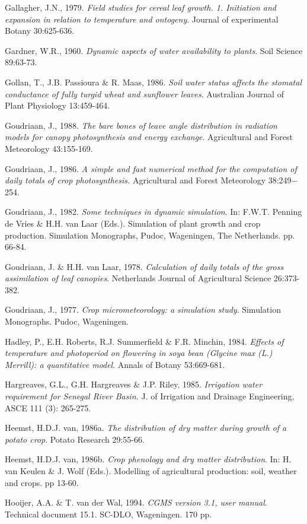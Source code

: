 Gallagher, J.N., 1979. {\it Field studies for cereal leaf growth. 1. Initiation and expansion in
relation to temperature and ontogeny\/}. Journal of experimental Botany 30:625-636.

Gardner, W.R., 1960. {\it Dynamic aspects of water availability to plants\/}. Soil Science 89:63-73.

Gollan, T., J.B. Passioura \& R. Maas, 1986. {\it Soil water status affects the stomatal
conductance of fully turgid wheat and sunflower leaves\/}. Australian Journal of Plant
Physiology 13:459-464.

Goudriaan, J., 1988. {\it The bare bones of leave angle distribution in radiation models for
canopy photosynthesis and energy exchange\/}. Agricultural and Forest Meteorology 43:155-169.

Goudriaan, J., 1986. {\it A simple and fast numerical method for the computation of daily totals
of crop photosynthesis.\/} Agricultural and Forest Meteorology 38:249$-$254. 

Goudriaan, J., 1982. {\it Some techniques in dynamic simulation\/}. In:  F.W.T. Penning de Vries
\& H.H. van Laar (Eds.). Simulation of plant growth and crop production. Simulation
Monographs, Pudoc, Wageningen, The Netherlands. pp. 66-84.

Goudriaan, J. \& H.H. van Laar, 1978. {\it Calculation of daily totals of the gross assimilation
of leaf canopies\/}. Netherlands Journal of Agricultural Science 26:373-382.

Goudriaan, J., 1977. {\it Crop micrometeorology: a simulation study\/}. Simulation Monographs.
Pudoc, Wageningen.

Hadley, P., E.H. Roberts, R.J. Summerfield \& F.R. Minchin, 1984. {\it Effects of temperature
and photoperiod on flowering in soya bean (Glycine max (L.) Merrill): a quantitative model\/}.
Annals of Botany 53:669-681.

Hargreaves, G.L., G.H. Hargreaves \& J.P. Riley, 1985. {\it Irrigation water requirement for
Senegal River Basin.\/} J. of Irrigation and Drainage Engineer\-ing, ASCE 111 (3): 265-275.

Heemst, H.D.J. van, 1986a. {\it The distribution of dry matter during growth of a potato crop\/}. Potato
Research 29:55-66. 

Heemst, H.D.J. van, 1986b. {\it Crop phenology and dry matter distribution\/}. In:  H. van Keulen \& J.
Wolf (Eds.). Modelling of agricultural production: soil, weather and crops. pp 13-60.

Hooijer, A.A. \& T. van der Wal, 1994. {\it CGMS version 3.1, user manual\/}. Technical document 15.1.
SC-DLO, Wageningen. 170 pp.

